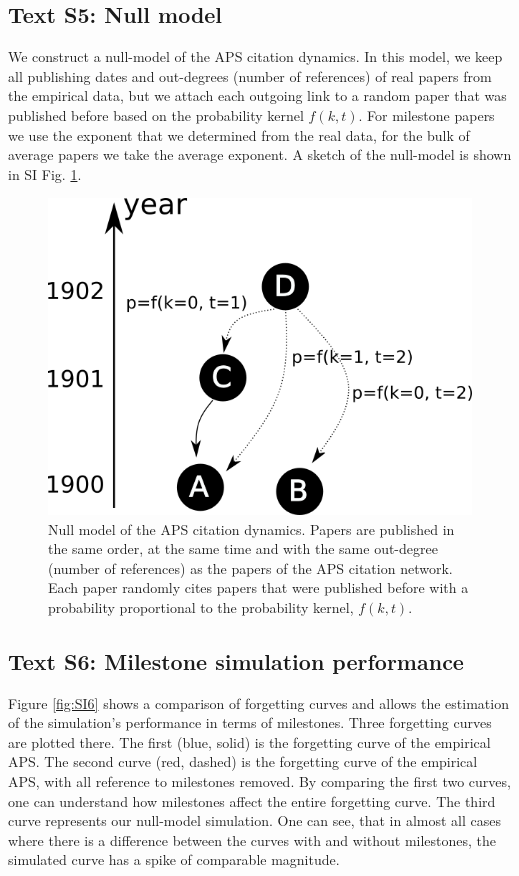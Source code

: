 \documentclass[fleqn,10pt]{wlscirep}
\begin{document}
\subsection*{Text S5: Null model}
\label{SI5}

We construct a null-model of the APS citation dynamics. In this model, we keep all publishing dates and out-degrees (number of references) of real papers from the empirical data, but we attach each outgoing link to a random paper that was published before based on the probability kernel $f(k,t)$. For milestone papers we use the exponent that we determined from the real data, for the bulk of average papers we take the average exponent. A sketch of the null-model is shown in  SI Fig. \ref{fig:null}.

\begin{figure}[H]
	\centering
	 \includegraphics[width=0.7\columnwidth]{null.png}
	\caption{Null model of the APS citation dynamics. Papers are published in the same order, at the same time and with the same out-degree (number of references) as the papers of the APS citation network. Each paper randomly cites papers that were published before with a probability proportional to the probability kernel, $f(k,t)$.
	}
	\label{fig:null}
\end{figure}


\subsection*{Text S6: Milestone simulation performance}
\label{SI6}

Figure \ref{fig:SI6} shows a comparison of forgetting curves and allows the estimation of the simulation's performance in terms of milestones. Three forgetting curves are plotted there. The first (blue, solid) is the forgetting curve of the empirical APS. The second curve (red, dashed) is the forgetting curve of the empirical APS, with all reference to milestones removed. By comparing the first two curves, one can understand how milestones affect the entire forgetting curve. The third curve represents our null-model simulation. One can see, that in almost all cases where there is a difference between the curves with and without milestones, the simulated curve has a spike of comparable magnitude.
\end{document}
